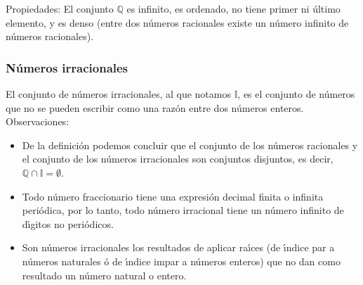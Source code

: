 \documentclass{article}
\begin{document}
Propiedades: El conjunto $\mathbb{Q}$ es infinito, es ordenado, no tiene primer ni \'ultimo elemento, y es denso (entre dos n\'umeros racionales existe un n\'umero infinito de n\'umeros racionales).

\subsubsection{N\'umeros irracionales}
El conjunto de n\'umeros irracionales, al que notamos $\mathbb{I}$, es el conjunto de n\'umeros que no se pueden escribir como una raz\'on entre dos n\'umeros enteros.
Observaciones:
\begin{itemize}
  \item De la definici\'on podemos concluir que el conjunto de los n\'umeros racionales y el conjunto de los n\'umeros irracionales son conjuntos disjuntos, es decir, $\mathbb{Q} \cap \mathbb{I} = \emptyset$.
  \item Todo n\'umero fraccionario tiene una expresi\'on decimal finita o infinita peri\'odica, por lo tanto, todo n\'umero irracional tiene un n\'umero infinito de d\'ıgitos no peri\'odicos.
  \item Son n\'umeros irracionales los resultados de aplicar ra\'ıces (de \'ındice par a n\'umeros naturales \'o de \'ındice impar a n\'umeros enteros) que no dan como resultado un n\'umero natural o entero.
\end{itemize}
\end{document}
